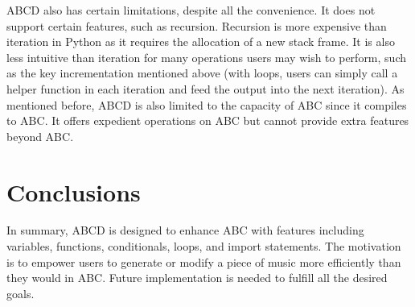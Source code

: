 ABCD also has certain limitations, despite all the convenience. It does not support certain features, such as recursion. Recursion is more expensive than iteration in Python as it requires the allocation of a new stack frame.  It is also less intuitive than iteration for many operations users may wish to perform, such as the key incrementation mentioned above (with loops, users can simply call a helper function in each iteration and feed the output into the next iteration). As mentioned before, ABCD is also limited to the capacity of ABC since it compiles to ABC. It offers expedient operations on ABC but cannot provide extra features beyond ABC.

\section{Conclusions}
In summary, ABCD is designed to enhance ABC with features including variables, functions, conditionals, loops, and import statements. The motivation is to empower users to generate or modify a piece of music more efficiently than they would in ABC.  Future implementation is needed to fulfill all the desired goals.

